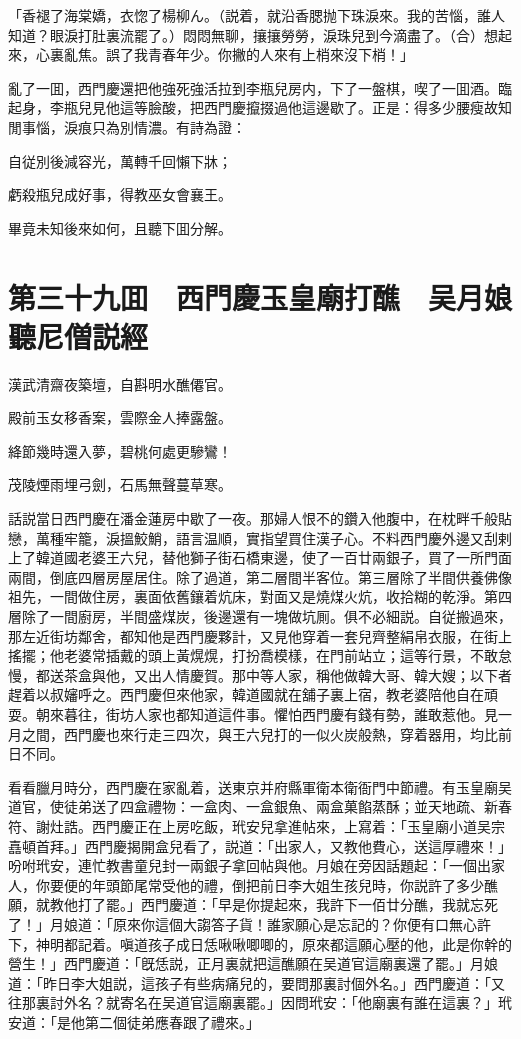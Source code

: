 「香褪了海棠嬌，衣惚了楊柳ん。（説着，就沿香腮抛下珠淚來。我的苦惱，誰人知道？眼淚打肚裏流罷了。）悶悶無聊，攘攘勞勞，淚珠兒到今滴盡了。（合）想起來，心裏亂焦。誤了我青春年少。你撇的人來有上梢來沒下梢！」

亂了一囬，西門慶還把他強死強活拉到李瓶兒房内，下了一盤棋，喫了一囬酒。臨起身，李瓶兒見他這等臉酸，把西門慶攛掇過他這邊歇了。正是：得多少腰瘦故知閒事惱，淚痕只為別情濃。有詩為證：

自従別後減容光，萬轉千回懶下牀；

虧殺瓶兒成好事，得教巫女會襄王。

畢竟未知後來如何，且聽下囬分解。

\chapter*{第三十九囬　西門慶玉皇廟打醮　吴月娘聽尼僧説經}

漢武清齋夜築壇，自斟明水醮僊官。

殿前玉女移香案，雲際金人捧露盤。

絳節幾時還入夢，碧桃何處更驂鸞！

茂陵煙雨埋弓劍，石馬無聲蔓草寒。

話説當日西門慶在潘金蓮房中歇了一夜。那婦人恨不的鑽入他腹中，在枕畔千般貼戀，萬種牢籠，淚搵鮫鮹，語言温順，實指望買住漢子心。不料西門慶外邊又刮剌上了韓道國老婆王六兒，替他獅子街石橋東邊，使了一百廿兩銀子，買了一所門面兩間，倒底四層房屋居住。除了過道，第二層間半客位。第三層除了半間供養佛像祖先，一間做住房，裏面依舊鑲着炕床，對面又是燒煤火炕，收拾糊的乾淨。第四層除了一間廚房，半間盛煤炭，後邊還有一塊做坑厠。俱不必細説。自従搬過來，那左近街坊鄰舍，都知他是西門慶夥計，又見他穿着一套兒齊整絹帛衣服，在街上搖擺；他老婆常插戴的頭上黃熀熀，打扮喬模樣，在門前站立；這等行景，不敢怠慢，都送茶盒與他，又出人情慶賀。那中等人家，稱他做韓大哥、韓大嫂；以下者趕着以叔嬸呼之。西門慶但來他家，韓道國就在舖子裏上宿，教老婆陪他自在頑耍。朝來暮往，街坊人家也都知道這件事。懼怕西門慶有錢有勢，誰敢惹他。見一月之間，西門慶也來行走三四次，與王六兒打的一似火炭般熱，穿着器用，均比前日不同。

看看臘月時分，西門慶在家亂着，送東京并府縣軍衛本衛衙門中節禮。有玉皇廟吴道官，使徒弟送了四盒禮物：一盒肉、一盒銀魚、兩盒菓餡蒸酥；並天地疏、新春符、謝灶誥。西門慶正在上房吃飯，玳安兒拿進帖來，上寫着：「玉皇廟小道吴宗嚞頓首拜。」西門慶揭開盒兒看了，説道：「出家人，又教他費心，送這厚禮來！」吩咐玳安，連忙教書童兒封一兩銀子拿回帖與他。月娘在旁因話題起：「一個出家人，你要便的年頭節尾常受他的禮，倒把前日李大姐生孩兒時，你説許了多少醮願，就教他打了罷。」西門慶道：「早是你提起來，我許下一佰廿分醮，我就忘死了！」月娘道：「原來你這個大謅答子貨！誰家願心是忘記的？你便有口無心許下，神明都記着。嗔道孩子成日恁啾啾唧唧的，原來都這願心壓的他，此是你幹的營生！」西門慶道：「旣恁説，正月裏就把這醮願在吴道官這廟裏還了罷。」月娘道：「昨日李大姐説，這孩子有些病痛兒的，要問那裏討個外名。」西門慶道：「又往那裏討外名？就寄名在吴道官這廟裏罷。」因問玳安：「他廟裏有誰在這裏？」玳安道：「是他第二個徒弟應春跟了禮來。」

